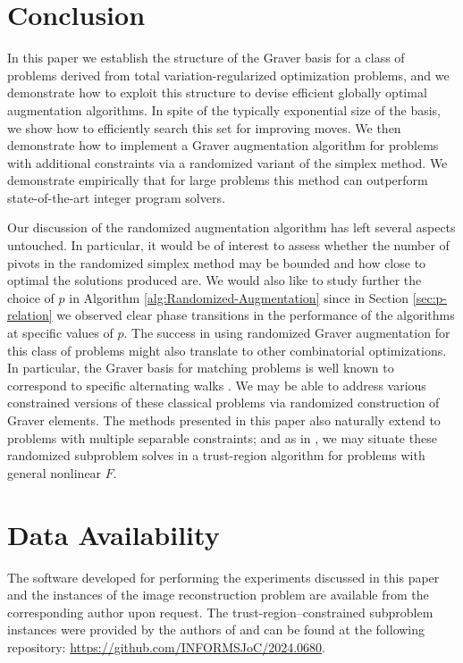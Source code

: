 \documentclass[pdflatex,sn-mathphys-num]{sn-jnl}%
\newcommand{\Miles}[1]{\textcolor{teal}{[Miles: #1]}}
\begin{document}
\section{Conclusion}
\label{sec:conclusion}
In this paper we establish the structure of the Graver basis for a class of problems derived from total variation-regularized optimization problems, and we demonstrate how to exploit this structure to devise efficient globally optimal augmentation algorithms.
In spite of the typically exponential size of the basis, we show how to efficiently search this set for improving moves. 
We then demonstrate how to implement a Graver augmentation algorithm for problems with additional constraints via a randomized variant of the simplex method.
We demonstrate empirically that for large problems this method can outperform state-of-the-art integer program solvers.

Our discussion of the randomized augmentation algorithm has left several aspects  untouched.
In particular, it would be of interest to assess whether the number of pivots in the randomized simplex method may be bounded and how close to optimal the solutions produced are.
We would also like to study further the choice of $p$ in Algorithm \ref{alg:Randomized-Augmentation} since in Section \ref{sec:p-relation} we observed clear phase transitions in the performance of the algorithms at specific values of $p$.
The success in using randomized Graver augmentation for this class of problems might also translate to other combinatorial optimizations.
In particular, the Graver basis for matching problems is well known to correspond to specific alternating walks \cite{reyes2012minimal}. 
We may be able to address various constrained versions of these classical problems via randomized construction of Graver elements.
The methods presented in this paper also naturally extend to problems with multiple separable constraints; and as in \cite{manns2024discrete}, we may situate these randomized subproblem solves in a trust-region algorithm for problems with general nonlinear $F$.
\section*{Data Availability}
The software developed for performing the experiments discussed in this paper and the instances of the image reconstruction problem are available from the corresponding author upon request. The trust-region--constrained subproblem instances were provided by the authors of \cite{manns2024discrete} and can be found at the following repository: \url{https://github.com/INFORMSJoC/2024.0680}.
\end{document}
